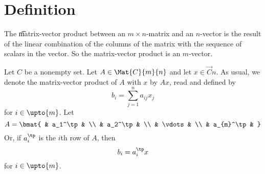 
\section*{Definition}

The \t{matrix-vector product} between an $m \times n$-matrix and an $n$-vector is the result of the linear combination of the columns of the matrix with the sequence of scalars in the vector.
So the matrix-vector product is an $m$-vector.


Let $C$ be a nonempty set.
Let $A \in \Mat{C}{m}{n}$ and let $x \in \Vec{C}{n}$.
As usual, we denote the matrix-vector product of $A$ with $x$ by $Ax$, read  and defined by
  \[
b_i = \sum_{j = 1}^{n} a_{ij}x_j
  \]
for $i \in \upto{m}$.
Let
  \[
A = \bmat{
& a_1^\tp & \\
& a_2^\tp & \\
& \vdots & \\
& a_{m}^\tp &
}
  \]
Or, if $a_i^\tp$ is the $i$th row of $A$, then
  \[
b_i = a_i^\tp x
  \]
for $i \in \upto{m}$.

\blankpage
